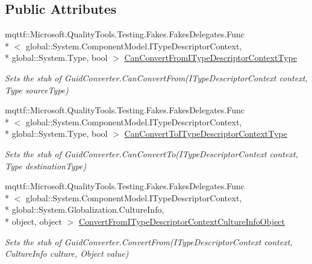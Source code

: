 \subsection*{Public Attributes}
\begin{DoxyCompactItemize}
\item 
mqttf\-::\-Microsoft.\-Quality\-Tools.\-Testing.\-Fakes.\-Fakes\-Delegates.\-Func\\*
$<$ global\-::\-System.\-Component\-Model.\-I\-Type\-Descriptor\-Context, \\*
global\-::\-System.\-Type, bool $>$ \hyperlink{class_system_1_1_component_model_1_1_fakes_1_1_stub_guid_converter_a28b832d0475ab9ef1c1dd9e24a89c9e2}{Can\-Convert\-From\-I\-Type\-Descriptor\-Context\-Type}
\begin{DoxyCompactList}\small\item\em Sets the stub of Guid\-Converter.\-Can\-Convert\-From(\-I\-Type\-Descriptor\-Context context, Type source\-Type)\end{DoxyCompactList}\item 
mqttf\-::\-Microsoft.\-Quality\-Tools.\-Testing.\-Fakes.\-Fakes\-Delegates.\-Func\\*
$<$ global\-::\-System.\-Component\-Model.\-I\-Type\-Descriptor\-Context, \\*
global\-::\-System.\-Type, bool $>$ \hyperlink{class_system_1_1_component_model_1_1_fakes_1_1_stub_guid_converter_ab1a4143265127762b1d83a391281e9c1}{Can\-Convert\-To\-I\-Type\-Descriptor\-Context\-Type}
\begin{DoxyCompactList}\small\item\em Sets the stub of Guid\-Converter.\-Can\-Convert\-To(\-I\-Type\-Descriptor\-Context context, Type destination\-Type)\end{DoxyCompactList}\item 
mqttf\-::\-Microsoft.\-Quality\-Tools.\-Testing.\-Fakes.\-Fakes\-Delegates.\-Func\\*
$<$ global\-::\-System.\-Component\-Model.\-I\-Type\-Descriptor\-Context, \\*
global\-::\-System.\-Globalization.\-Culture\-Info, \\*
object, object $>$ \hyperlink{class_system_1_1_component_model_1_1_fakes_1_1_stub_guid_converter_ad6ef6325412c45f4bea7add53593f53f}{Convert\-From\-I\-Type\-Descriptor\-Context\-Culture\-Info\-Object}
\begin{DoxyCompactList}\small\item\em Sets the stub of Guid\-Converter.\-Convert\-From(\-I\-Type\-Descriptor\-Context context, Culture\-Info culture, Object value)\end{DoxyCompactList}\item 

\end{DoxyCompactItemize}

